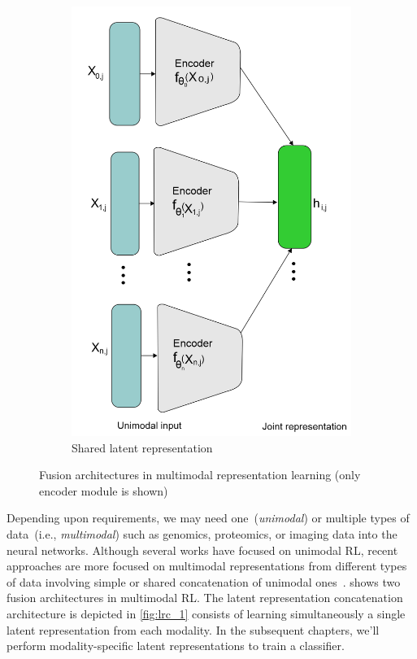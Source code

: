 \begin{figure}[htp!]
\begin{subfigure}{0.48\linewidth}
		\centering
		\includegraphics[scale=0.4]{images/shared.png}
		\caption{Shared latent representation}
        \label{fig:slr_1}
	\end{subfigure}
	\caption{Fusion architectures in multimodal representation learning (only encoder module is shown)} 
	\label{fig:mm_rL_example}
\end{figure}

\hspace*{3.5mm} Depending upon requirements, we may need one~(\textit{unimodal}) or multiple types of data~(i.e., \textit{multimodal}) such as genomics, proteomics, or imaging data into the neural networks. Although several works have focused on unimodal RL, recent approaches are more focused on multimodal representations from different types of data involving simple or shared concatenation of unimodal ones~\cite{mmsurvey}.  shows two fusion architectures in multimodal RL. The latent representation concatenation architecture is depicted in \cref{fig:lrc_1} consists of learning simultaneously a single latent representation from each modality. In the subsequent chapters, we'll perform modality-specific latent representations to train a classifier. 

